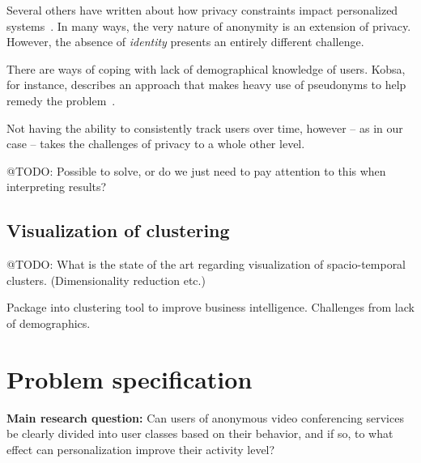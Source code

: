 Several others have written about how privacy constraints impact personalized systems~\cite{Teltzrow2004,Kobsa2007}. In many ways, the very nature of anonymity is an extension of privacy. However, the absence of \emph{identity} presents an entirely different challenge.

There are ways of coping with lack of demographical knowledge of users. Kobsa, for instance, describes an approach that makes heavy use of pseudonyms to help remedy the problem~\cite{Kobsa2003}.

Not having the ability to consistently track users over time, however -- as in our case -- takes the challenges of privacy to a whole other level.

@TODO: Possible to solve, or do we just need to pay attention to this when interpreting results?

\subsection{Visualization of clustering}

@TODO: What is the state of the art regarding visualization of spacio-temporal clusters. (Dimensionality reduction etc.)

Package into clustering tool to improve business intelligence. Challenges from lack of demographics.

\section{Problem specification}
\label{sec:problem_specification}

\textbf{Main research question:} Can users of anonymous video conferencing services be clearly divided into user classes based on their behavior, and if so, to what effect can personalization improve their activity level?

